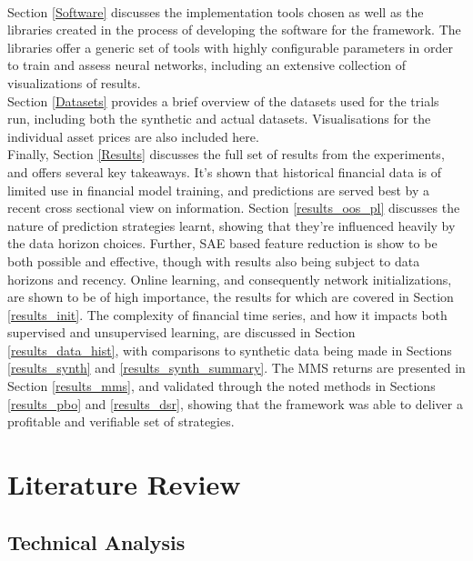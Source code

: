 \documentclass[a4paper,11pt,oneside]{article}
\theoremstyle{plain}
\theoremstyle{definition}
\begin{document}
	~\\\newline
		Section \ref{Software} discusses the implementation tools chosen as well as the libraries created in the process of developing the software for the framework. The libraries offer a generic set of tools with highly configurable parameters in order to train and assess neural networks, including an extensive collection of visualizations of results.
	~\\\newline
		Section \ref{Datasets} provides a brief overview of the datasets used for the trials run, including both the synthetic and actual datasets. Visualisations for the individual asset prices are also included here.
	~\\\newline
		Finally, Section \ref{Results} discusses the full set of results from the experiments, and offers several key takeaways. It's shown that historical financial data is of limited use in financial model training, and predictions are served best by a recent cross sectional view on information. Section \ref{results_oos_pl} discusses the nature of prediction strategies learnt, showing that they're influenced heavily by the data horizon choices. Further, SAE based feature reduction is show to be both possible and effective, though with results also being subject to data horizons and recency. Online learning, and consequently network initializations, are shown to be of high importance, the results for which are covered in Section \ref{results_init}. The complexity of financial time series, and how it impacts both supervised and unsupervised learning, are discussed in Section \ref{results_data_hist}, with comparisons to synthetic data being made in Sections \ref{results_synth} and \ref{results_synth_summary}. The MMS returns are presented in Section \ref{results_mms}, and validated through the noted methods in Sections \ref{results_pbo} and \ref{results_dsr}, showing that the framework was able to deliver a profitable and verifiable set of strategies.
	

	
	
	\newpage
	\section{Literature Review}\label{lr_LiteratureReview}
	\subsection{Technical Analysis}\label{lr_TechnicalAnalysis}
	
\end{document}
